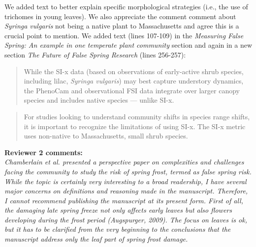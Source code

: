 \documentclass[11pt,a4paper]{article}
\begin{document}
We added text to better explain specific morphological strategies (i.e., the use of trichomes in young leaves). We also appreciate the comment comment about \textit{Syringa vulgaris} not being a native plant to Massachusetts and agree this is a crucial point to mention. We added text (lines 107-109) in the \textit{Measuring False Spring: An example in one temperate plant community} section and again in a new section \textit{The Future of False Spring Research} (lines 256-257):\\

\begin{quotation}
While the SI-x data (based on observations of early-active shrub species, including lilac, \emph{Syringa vulgaris}) may best capture understory dynamics, the PhenoCam and observational FSI data integrate over larger canopy species and includes native species --- unlike SI-x.
\end{quotation}

\begin{quotation}
For studies looking to understand community shifts in species range shifts, it is important to recognize the limitations of using SI-x. The SI-x metric uses non-native to Massachusetts, small shrub species.
\end{quotation}


\textbf {Reviewer 2 comments:} \\

\textit{Chamberlain et al. presented a perspective paper on complexities and challenges facing the community to study the risk of spring frost, termed as false spring risk. While the topic is certainly very interesting to a broad readership, I have several major concerns on definitions and reasoning made in the manuscript. Therefore, I cannot recommend publishing the manuscript at its present form. First of all, the damaging late spring freeze not only affects early leaves but also flowers developing during the frost period (Augspurger, 2009). The focus on leaves is ok, but it has to be clarified from the very beginning to the conclusions that the manuscript address only the leaf part of spring frost damage.}\\
\end{document}

